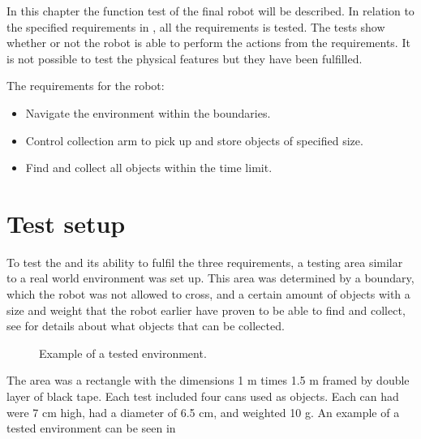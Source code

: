 In this chapter the function test of the final robot will be described. In relation to the specified requirements in , all the requirements is tested. The tests show whether or not the robot is able to perform the actions from the requirements. It is not possible to test the physical features but they have been fulfilled.

The requirements for the robot: 
\begin{itemize}
\item Navigate the environment within the boundaries.
\item Control collection arm to pick up and store objects of specified size.
\item Find and collect all objects within the time limit.
\end{itemize}


\section{Test setup}
To test the \projname{} and its ability to fulfil the three requirements, a testing area similar to a real world environment was set up. This area was determined by a boundary, which the robot was not allowed to cross, and a certain amount of objects with a size and weight that the robot earlier have proven to be able to find and collect, see  for details about what objects that can be collected.

\begin{figure}[H]
     \center{}
     \caption{\label{fig:test-setup} Example of a tested environment.}
\end{figure}

The area was a rectangle with the dimensions 1 m times 1.5 m framed by double layer of black tape. Each test included four cans used as objects. Each can had were 7 cm high, had a diameter of 6.5 cm, and weighted 10 g. An example of a tested environment can be seen in 

